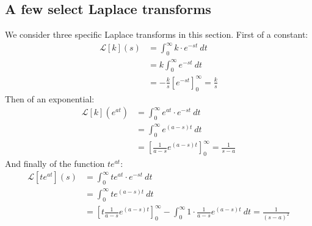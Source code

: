 \documentclass[12pt, a4paper]{article}
\numberwithin{equation}{section}
\begin{document}
\subsection{A few select Laplace transforms}
We consider three specific Laplace transforms in this section. First of a constant:
\begin{align}
\mathcal{L}[k](s)&=\int_0^\infty k\cdot e^{-st}\ dt\\
&=k\int_0^\infty e^{-st}\ dt\\
&=-\frac{k}{s}[e^{-st}]_0^\infty=\frac{k}{s}
\end{align}
Then of an exponential:
\begin{align}
\mathcal{L}[k](e^{at})&=\int_0^\infty e^{at}\cdot e^{-st}\ dt\\
&=\int_0^\infty e^{(a-s)t}\ dt\\
&=\left[\frac{1}{a-s}e^{(a-s)t}\right]_0^\infty=\frac{1}{s-a}
\end{align}
And finally of the function $te^{at}$:
\begin{align}
\mathcal{L}[te^{at}](s)&=\int_0^\infty te^{at}\cdot e^{-st}\ dt\\
&=\int_0^\infty te^{(a-s)t}\ dt\\
&=\left[t\frac{1}{a-s}e^{(a-s)t}\right]_0^\infty-\int_0^\infty 1\cdot\frac{1}{a-s}e^{(a-s)t}\ dt=\frac{1}{(s-a)^2}
\end{align}
\end{document}
